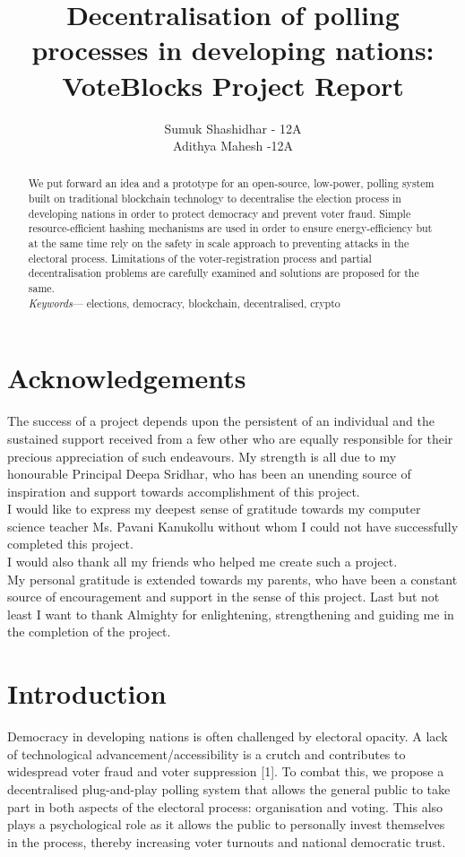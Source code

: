 \documentclass{article}
\title{Decentralisation of polling processes in developing nations: VoteBlocks Project Report}
\author{Sumuk Shashidhar - 12A \\ Adithya Mahesh -12A}
\affil{Sri Kumaran Children's Home}
\begin{document}
    \maketitle
    \begin{abstract}
        We put forward an idea and a prototype for an open-source, low-power, polling system built on traditional blockchain technology to decentralise the election process in developing nations in order to protect democracy and prevent voter fraud. Simple resource-efficient hashing mechanisms are used in order to ensure energy-efficiency but at the same time rely on the safety in scale approach to preventing attacks in the electoral process. Limitations of the voter-registration process and partial decentralisation problems are carefully examined and solutions are proposed for the same. \\

        \textit{Keywords}— elections, democracy, blockchain, decentralised, crypto
    \end{abstract}
    \pagebreak
    
    \section*{\centering Acknowledgements}
    The success of a project depends upon the persistent of an individual and the sustained support received from a few other who are equally responsible for their precious appreciation of such endeavours. My strength is all due to my honourable Principal Deepa Sridhar, who has been an unending source of inspiration and support towards accomplishment of this project. \\

    I would like to express my deepest sense of gratitude towards my computer science teacher Ms. Pavani Kanukollu without whom I could not have successfully completed this project. \\
    
    I would also thank all my friends who helped me create such a project. \\ 
    
    My personal gratitude is extended towards my parents, who have been a constant source of encouragement and support in the sense of this project. Last but not least I want to thank Almighty for enlightening, strengthening and guiding me in the completion of the project.
    \pagebreak
    \tableofcontents
    \pagebreak
    \section{Introduction}
    Democracy in developing nations is often challenged by electoral opacity. A lack of technological advancement/accessibility is a crutch and contributes to widespread voter fraud and voter suppression [1]. To combat this, we propose a decentralised plug-and-play polling system that allows the general public to take part in both aspects of the electoral process: organisation and voting. This also plays a psychological role as it allows the public to personally invest themselves in the process, thereby increasing voter turnouts and national democratic trust.
\end{document}

